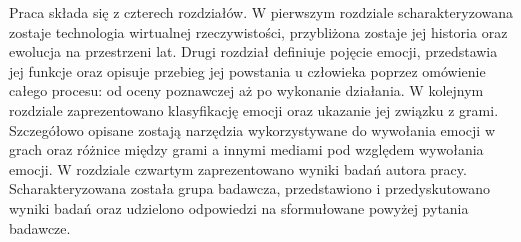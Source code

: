 Praca składa się z czterech rozdziałów. W pierwszym rozdziale scharakteryzowana zostaje technologia wirtualnej rzeczywistości, przybliżona zostaje jej historia oraz ewolucja na przestrzeni lat. Drugi rozdział definiuje pojęcie emocji, przedstawia jej funkcje oraz opisuje przebieg jej powstania u człowieka poprzez omówienie całego procesu: od oceny poznawczej aż po wykonanie działania. W kolejnym rozdziale zaprezentowano klasyfikację emocji oraz ukazanie jej związku z grami. Szczegółowo opisane zostają narzędzia wykorzystywane do wywołania emocji w grach oraz różnice między grami a innymi mediami pod względem wywołania emocji. W rozdziale czwartym zaprezentowano wyniki badań autora pracy. Scharakteryzowana została grupa badawcza, przedstawiono i przedyskutowano wyniki badań oraz udzielono odpowiedzi na sformułowane powyżej pytania badawcze.